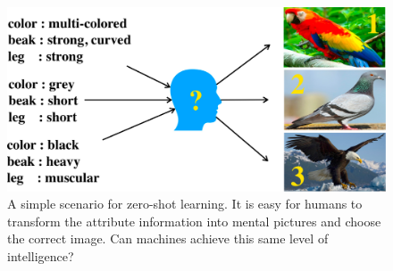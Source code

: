 \documentclass[letterpaper]{article} %
\begin{document}
\begin{figure}[t!]
\begin{center}
\includegraphics[width=0.9\columnwidth]{zero-shot-example-v2-crop-.pdf}
\end{center}
\caption{A simple scenario for zero-shot learning. 
It is easy for humans to transform the attribute information into mental pictures and choose the correct image. Can machines achieve this same level of intelligence?}
\label{fig:zero-shot-simple}
\end{figure}
\end{document}
